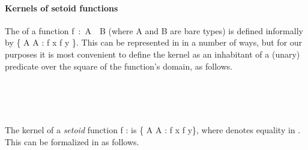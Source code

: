 \paragraph*{Kernels of setoid functions}
The  of a function \ab f~\as :~\ab A~~\ab B (where \ab A and \ab B are bare types) is defined
informally by \{  \ab A  \ab A \as : \ab f \ab x \as{=} \ab f \ab y \}.
This can be represented in \agda in a number of ways, but for our purposes it is most
convenient to define the kernel as an inhabitant of a (unary) predicate over the square of
the function's domain, as follows.

\begin{code}%
\>[0]\<%
\\
\>[0]\AgdaSpace{}%
\AgdaSymbol{:}\AgdaSpace{}%
\AgdaSymbol{\{}\AgdaSpace{}%
\AgdaSymbol{:}\AgdaSpace{}%
\AgdaSpace{}%
\AgdaSymbol{\}\{}\AgdaSpace{}%
\AgdaSymbol{:}\AgdaSpace{}%
\AgdaSpace{}%
\AgdaSymbol{\}}\AgdaSpace{}%
\AgdaSpace{}%
\AgdaSpace{}%
\AgdaSpace{}%
\AgdaSpace{}%
\AgdaSpace{}%
\AgdaSymbol{(}\AgdaSpace{}%
\AgdaSpace{}%
\AgdaSymbol{)}\AgdaSpace{}%
\AgdaSpace{}%
\AgdaSpace{}%
\AgdaSymbol{(}\AgdaSpace{}%
\AgdaSpace{}%
\AgdaSymbol{)}\AgdaSpace{}%
\<%
\\
\>[0]\AgdaSpace{}%
\AgdaSpace{}%
\AgdaSpace{}%
\AgdaSymbol{(}\AgdaSpace{}%
\AgdaOperator{\AgdaInductiveConstructor{,}}\AgdaSpace{}%
\AgdaSymbol{)}\AgdaSpace{}%
\AgdaSymbol{=}\AgdaSpace{}%
\AgdaSpace{}%
\AgdaSpace{}%
\AgdaSpace{}%
\AgdaSpace{}%
\<%
\\
\>[0]\<%
\end{code}
The kernel of a \emph{setoid} function \ab f \as :    is \{  \ab A  \ab A \as : \ab f  \ab x  \ab f  \ab y\},
where  denotes equality in . This can be formalized in \agda as follows.

